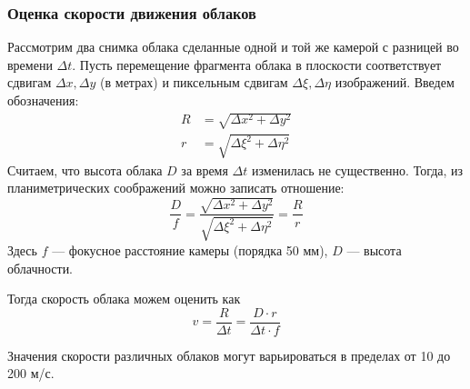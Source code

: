 %
%

\subsubsection{Оценка скорости движения облаков}
Рассмотрим два снимка облака сделанные одной и той же камерой с разницей во
времени $\Delta t$. Пусть перемещение фрагмента облака в плоскости соответствует
сдвигам $\Delta x, \Delta y$ (в метрах) и пиксельным сдвигам
$\Delta \xi, \Delta \eta$ изображений. Введем обозначения:
\begin{align*}
  R &= \sqrt{\Delta x^2 + \Delta y^2}\\
  r &= \sqrt{\Delta \xi^2 + \Delta \eta^2}
\end{align*}
Считаем, что высота облака $D$ за время $\Delta t$ изменилась не существенно.
Тогда, из планиметрических соображений можно записать отношение:
\begin{equation}
  \frac{D}{f} = \frac{
    \sqrt{\Delta x^2 + \Delta y^2}
  }{
    \sqrt{\Delta \xi^2 + \Delta \eta^2}
  } = \frac{R}{r}
\end{equation}
Здесь $f$ --- фокусное расстояние камеры (порядка 50 мм), $D$ --- высота
облачности.

Тогда скорость облака можем оценить как
\begin{equation}
  v = \frac{R}{\Delta t} =  \frac{D \cdot r}{\Delta t \cdot f}
\end{equation}

Значения скорости различных облаков могут варьироваться в пределах от 10 до
200 м/с.